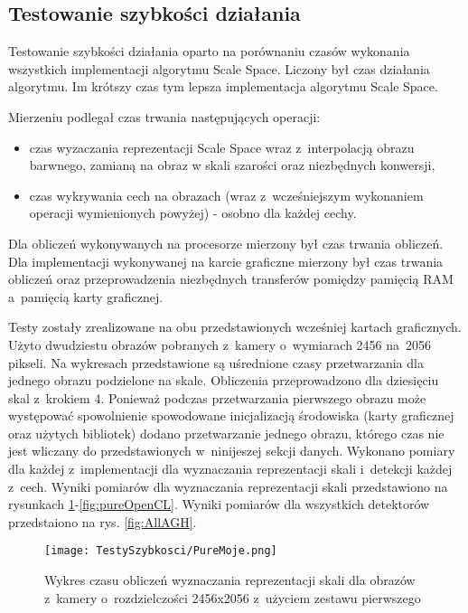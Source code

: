 \subsection{Testowanie szybkości działania}
\label{sec:testSzybkosci}

Testowanie szybkości działania oparto na porównaniu czasów wykonania wszystkich implementacji algorytmu Scale Space. Liczony był czas działania algorytmu. Im krótszy czas tym lepsza implementacja algorytmu Scale Space.

Mierzeniu podlegał czas trwania następujących operacji:
\begin{itemize}
\item czas wyzaczania reprezentacji Scale Space wraz z~interpolacją obrazu barwnego, zamianą na obraz w skali szarości oraz niezbędnych konwersji,
\item czas wykrywania cech na obrazach (wraz z~wcześniejszym wykonaniem operacji wymienionych powyżej) - osobno dla każdej cechy.
\end{itemize}

Dla obliczeń wykonywanych na procesorze mierzony był czas trwania obliczeń. Dla implementacji wykonywanej na karcie graficzne mierzony był czas trwania obliczeń oraz przeprowadzenia niezbędnych transferów pomiędzy pamięcią RAM a~pamięcią karty graficznej.

Testy zostały zrealizowane na obu przedstawionych wcześniej kartach graficznych. Użyto dwudziestu obrazów pobranych z~kamery o~wymiarach 2456 na~2056 pikseli. Na wykresach przedstawione są uśrednione czasy przetwarzania dla jednego obrazu podzielone na skale. Obliczenia przeprowadzono dla dziesięciu skal z~krokiem 4. Ponieważ podczas przetwarzania pierwszego obrazu może występować spowolnienie spowodowane inicjalizacją środowiska (karty graficznej oraz użytych bibliotek) dodano przetwarzanie jednego obrazu, którego czas nie jest wliczany do przedstawionych w~ninijeszej sekcji danych. Wykonano pomiary dla każdej z~implementacji dla wyznaczania reprezentacji skali i~detekcji każdej z~cech. Wyniki pomiarów dla wyznaczania reprezentacji skali przedstawiono na rysunkach \ref{fig:pureSzybkoscMoje}-\ref{fig:pureOpenCL}. Wyniki pomiarów dla wszystkich detektorów przedstaiono na rys. \ref{fig:AllAGH}.

\begin{figure}[h]
\begin{center}
\texttt{[image: TestySzybkosci/PureMoje.png]}
\end{center}
\caption{Wykres czasu obliczeń wyznaczania reprezentacji skali dla obrazów z~kamery o~rozdzielczości 2456x2056 z~użyciem zestawu pierwszego}
\label{fig:pureSzybkoscMoje}
\end{figure}

